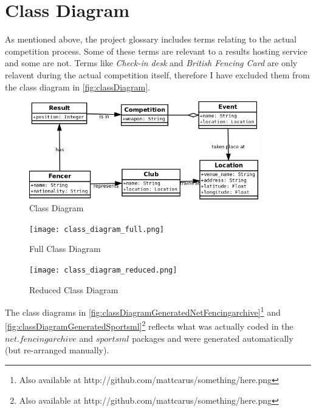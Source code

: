 \section{Class Diagram} \label{section:classDiagram}
As mentioned above, the project glossary includes terms relating to the actual
competition process. Some of these terms are relevant to a results hosting
service and some are not. Terms like \textit{Check-in desk} and
\textit{British Fencing Card } are only relavent during the actual competition
itself, therefore I have excluded them from the class diagram in
\vref{fig:classDiagram}.
\begin{figure}[!ht]
  \centering
  \includegraphics[width=10cm]{class_diagram.png}
  \caption{Class Diagram}
  \label{fig:classDiagram}
\end{figure}
\begin{figure}[!ht]
  \centering
  \texttt{[image: class\_diagram\_full.png]}
  \caption{Full Class Diagram}
  \label{fig:classDiagramFull}
\end{figure}
\begin{figure}[!ht]
  \centering
  \texttt{[image: class\_diagram\_reduced.png]}
  \caption{Reduced Class Diagram}
  \label{fig:classDiagramFull}
\end{figure}
The class diagrams in \vref{fig:classDiagramGeneratedNetFencingarchive}\footnote{Also available at
  http://github.com/mattcarus/something/here.png} and
\vref{fig:classDiagramGeneratedSportsml}\footnote{Also available at
  http://github.com/mattcarus/something/here.png} reflects what was actually coded in the
\(net.fencingarchive\) and \(sportsml\) packages and were generated
automatically (but re-arranged manually).

